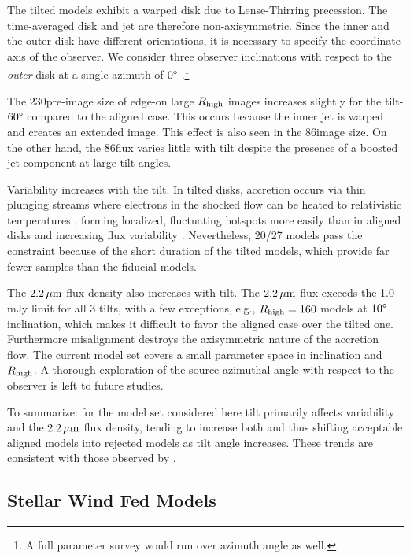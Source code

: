 The tilted models exhibit a warped disk due to  Lense-Thirring precession.
The time-averaged disk and jet are therefore non-axisymmetric.
Since the inner and the outer disk have different orientations, it is necessary to specify the coordinate axis of the observer.
We consider three  observer inclinations with respect to the {\em outer} disk at a single azimuth of $0\degree$ \citep[for more details, see][]{Chatterjee2020}.\footnote{A full parameter survey would run over azimuth angle as well.}

The 230\GHz pre-image size of edge-on large $R_\mathrm{high}$ images increases slightly for the tilt-$60\degree$ compared to the aligned case.
This occurs because the inner jet is warped and creates an extended image.
This effect is also seen in the 86\GHz image size.
On the other hand, the 86\GHz flux varies little with tilt despite the presence of a boosted jet component at large tilt angles.

Variability increases with the tilt.
In tilted disks, accretion occurs via thin plunging streams \citep[e.g.,][]{Fragile2007} where electrons in the shocked flow can be heated to relativistic temperatures \citep[e.g.,][]{Dexter2013, 2014ApJ...780...81G, White2019}, forming localized, fluctuating hotspots more easily than in aligned disks and increasing flux variability \citep{Chatterjee2020, 2021arXiv210412896W}.  Nevertheless, 20/27 models pass the  constraint because of the short duration of the tilted models, which provide far fewer  samples than the fiducial models.

The $2.2\,\mu\mathrm{m}$ flux density also increases with tilt.
The $2.2\,\mu\mathrm{m}$ flux exceeds the 1.0\,mJy limit for all 3 tilts, with a few exceptions, e.g., $R_\mathrm{high}=160$ models at $10\degree$ inclination, which makes it difficult to favor the aligned case over the tilted one.
Furthermore misalignment destroys the axisymmetric nature of the accretion flow.
The current model set covers a small parameter space in inclination and $R_\mathrm{high}$.
A thorough exploration of the source azimuthal angle with respect to the observer is left to future studies.

To summarize: for the model set considered here tilt primarily affects variability and the $2.2\,\mu\mathrm{m}$ flux density, tending to increase both and thus shifting acceptable aligned models into rejected models as tilt angle increases.
These trends are consistent with those observed by \cite{2021arXiv210412896W}.

\subsection{Stellar Wind Fed Models}

